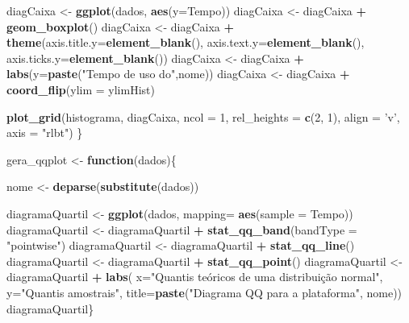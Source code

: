 \documentclass[
]{article}
\newenvironment{Shaded}{\begin{snugshade}}{\end{snugshade}}
\newcommand{\ControlFlowTok}[1]{\textcolor[rgb]{0.13,0.29,0.53}{\textbf{#1}}}
\newcommand{\DataTypeTok}[1]{\textcolor[rgb]{0.13,0.29,0.53}{#1}}
\newcommand{\DecValTok}[1]{\textcolor[rgb]{0.00,0.00,0.81}{#1}}
\newcommand{\KeywordTok}[1]{\textcolor[rgb]{0.13,0.29,0.53}{\textbf{#1}}}
\newcommand{\NormalTok}[1]{#1}
\newcommand{\OperatorTok}[1]{\textcolor[rgb]{0.81,0.36,0.00}{\textbf{#1}}}
\newcommand{\StringTok}[1]{\textcolor[rgb]{0.31,0.60,0.02}{#1}}
\begin{document}
\begin{Shaded}
\begin{Highlighting}[]
\NormalTok{  diagCaixa <-}\StringTok{ }\KeywordTok{ggplot}\NormalTok{(dados, }\KeywordTok{aes}\NormalTok{(}\DataTypeTok{y=}\NormalTok{Tempo))}
\NormalTok{  diagCaixa <-}\StringTok{ }\NormalTok{diagCaixa }\OperatorTok{+}\StringTok{ }\KeywordTok{geom_boxplot}\NormalTok{()}
\NormalTok{  diagCaixa <-}\StringTok{ }\NormalTok{diagCaixa }\OperatorTok{+}\StringTok{ }\KeywordTok{theme}\NormalTok{(}\DataTypeTok{axis.title.y=}\KeywordTok{element_blank}\NormalTok{(),}
                                 \DataTypeTok{axis.text.y=}\KeywordTok{element_blank}\NormalTok{(),}
                                 \DataTypeTok{axis.ticks.y=}\KeywordTok{element_blank}\NormalTok{())}
\NormalTok{  diagCaixa <-}\StringTok{ }\NormalTok{diagCaixa }\OperatorTok{+}\StringTok{ }\KeywordTok{labs}\NormalTok{(}\DataTypeTok{y=}\KeywordTok{paste}\NormalTok{(}\StringTok{"Tempo de uso do"}\NormalTok{,nome))}
\NormalTok{  diagCaixa <-}\StringTok{ }\NormalTok{diagCaixa }\OperatorTok{+}\StringTok{ }\KeywordTok{coord_flip}\NormalTok{(}\DataTypeTok{ylim =}\NormalTok{ ylimHist)}
  
  \KeywordTok{plot_grid}\NormalTok{(histograma, diagCaixa,  }
                     \DataTypeTok{ncol =} \DecValTok{1}\NormalTok{, }\DataTypeTok{rel_heights =} \KeywordTok{c}\NormalTok{(}\DecValTok{2}\NormalTok{, }\DecValTok{1}\NormalTok{),}
                     \DataTypeTok{align =} \StringTok{'v'}\NormalTok{, }\DataTypeTok{axis =} \StringTok{"rlbt"}\NormalTok{)  }
\NormalTok{\}}

\NormalTok{gera_qqplot <-}\StringTok{ }\ControlFlowTok{function}\NormalTok{(dados)\{}
  
 
  
\NormalTok{  nome            <-}\StringTok{ }\KeywordTok{deparse}\NormalTok{(}\KeywordTok{substitute}\NormalTok{(dados))}
  
\NormalTok{  diagramaQuartil <-}\StringTok{ }\KeywordTok{ggplot}\NormalTok{(dados, }\DataTypeTok{mapping=} \KeywordTok{aes}\NormalTok{(}\DataTypeTok{sample =}\NormalTok{ Tempo))}
\NormalTok{  diagramaQuartil <-}\StringTok{ }\NormalTok{diagramaQuartil }\OperatorTok{+}\StringTok{ }\KeywordTok{stat_qq_band}\NormalTok{(}\DataTypeTok{bandType =} \StringTok{"pointwise"}\NormalTok{)}
\NormalTok{  diagramaQuartil <-}\StringTok{ }\NormalTok{diagramaQuartil }\OperatorTok{+}\StringTok{ }\KeywordTok{stat_qq_line}\NormalTok{() }
\NormalTok{  diagramaQuartil <-}\StringTok{ }\NormalTok{diagramaQuartil }\OperatorTok{+}\StringTok{ }\KeywordTok{stat_qq_point}\NormalTok{()}
\NormalTok{  diagramaQuartil <-}\StringTok{ }\NormalTok{diagramaQuartil }\OperatorTok{+}\StringTok{ }\KeywordTok{labs}\NormalTok{( }\DataTypeTok{x=}\StringTok{"Quantis teóricos de uma distribuição normal"}\NormalTok{,}
                                             \DataTypeTok{y=}\StringTok{"Quantis amostrais"}\NormalTok{, }
                                             \DataTypeTok{title=}\KeywordTok{paste}\NormalTok{(}\StringTok{"Diagrama QQ para a plataforma"}\NormalTok{, nome))}
\NormalTok{  diagramaQuartil\}}


\end{Highlighting}
\end{Shaded}
\end{document}
